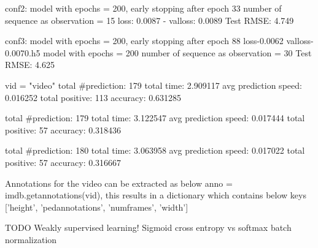 conf2: 
model with epochs = 200, early stopping after epoch 33
number of sequence as observation = 15
loss: 0.0087 - val\textunderscore loss: 0.0089
Test RMSE: 4.749

conf3:
model with epochs = 200, early stopping after epoch 88
loss-0.0062 val\textunderscore loss-0.0070.h5
model with epochs = 200
number of sequence as observation = 30
Test RMSE: 4.625


vid = "video"
total \#prediction: 179
total time: 2.909117
avg prediction speed: 0.016252
total positive: 113
accuracy: 0.631285

total \#prediction: 179
total time: 3.122547
avg prediction speed: 0.017444
total positive: 57
accuracy: 0.318436

total \#prediction: 180
total time: 3.063958
avg prediction speed: 0.017022
total positive: 57
accuracy: 0.316667


Annotations for the video can be extracted as below
anno = imdb.\textunderscore get\textunderscore annotations(vid), this results in a dictionary which contains below keys ['height', 'ped\textunderscore annotations', 'num\textunderscore frames', 'width']

TODO
\newpara Weakly supervised learning!
Sigmoid cross entropy vs  softmax
batch normalization
